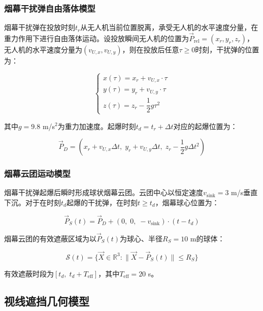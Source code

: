 \subsubsection{烟幕干扰弹自由落体模型}

烟幕干扰弹在投放时刻$t_r$从无人机当前位置脱离，承受无人机的水平速度分量，在重力作用下进行自由落体运动。设投放瞬间无人机的位置为$\vec{P}_{\text{rel}} = (x_r, y_r, z_r)$，无人机的水平速度分量为$(v_{U,x}, v_{U,y})$，则在投放后任意$\tau \ge 0$时刻，干扰弹的位置为：

\begin{equation}
    \begin{cases}
        x(\tau) = x_r + v_{U,x} \cdot \tau \\
        y(\tau) = y_r + v_{U,y} \cdot \tau \\
        z(\tau) = z_r - \dfrac{1}{2}g\tau^2
    \end{cases}
\end{equation}

其中$g=9.8$ m/s$^2$为重力加速度。起爆时刻$t_d = t_r + \Delta t$对应的起爆位置为：

\begin{equation}
    \vec{P}_D = \left(x_r + v_{U,x}\Delta t,\; y_r + v_{U,y}\Delta t,\; z_r - \frac{1}{2}g\Delta t^2\right)
\end{equation}

\subsubsection{烟幕云团运动模型}

烟幕干扰弹起爆后瞬时形成球状烟幕云团。云团中心以恒定速度$v_{\text{sink}} = 3$ m/s垂直下沉。对于在时刻$t_d$起爆的干扰弹，在时刻$t \ge t_d$，烟幕球心位置为：

\begin{equation}
    \vec{P}_S(t) = \vec{P}_D + (0,\; 0,\; -v_{\text{sink}}) \cdot (t - t_d)
\end{equation}

烟幕云团的有效遮蔽区域为以$\vec{P}_S(t)$为球心、半径$R_S = 10$ m的球体：

\begin{equation}
    \mathcal{S}(t) = \{\vec{X} \in \mathbb{R}^3 : \|\vec{X} - \vec{P}_S(t)\| \le R_S\}
\end{equation}

有效遮蔽时段为$[t_d,\; t_d + T_{\text{eff}}]$，其中$T_{\text{eff}} = 20$ s。

\subsection{视线遮挡几何模型}

